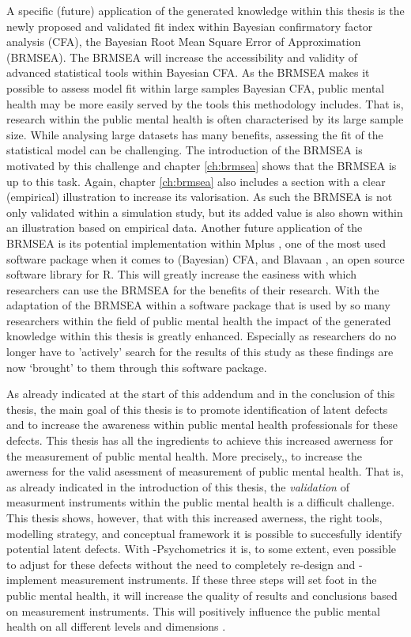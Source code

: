 A specific (future) application of the generated knowledge within this thesis is the newly proposed and validated fit index within Bayesian confirmatory factor analysis (CFA), the Bayesian Root Mean Square Error of Approximation (BRMSEA). 
The BRMSEA will increase the accessibility and validity of advanced statistical tools within Bayesian CFA. 
As the BRMSEA makes it possible to assess model fit within large samples Bayesian CFA, public mental health may be more easily served by the tools this methodology includes. 
That is, research within the public mental health is often characterised by its large sample size. 
While analysing large datasets has many benefits, assessing the fit of the statistical model can be challenging. 
The introduction of the BRMSEA is motivated by this challenge and chapter \ref{ch:brmsea} shows that the BRMSEA is up to this task. 
Again, chapter \ref{ch:brmsea} also includes a section with a clear (empirical) illustration to increase its valorisation. As such the BRMSEA is not only validated within a simulation study, but its added value is also shown within an illustration based on empirical data. 
Another future application of the BRMSEA is its potential implementation within Mplus \parencite{Muthen_1998}, one of the most used software package when it comes to (Bayesian) CFA, and Blavaan \parencite{Merkle_2016}, an open source software library for R. 
This will greatly increase the easiness with which researchers can use the BRMSEA for the benefits of their research. 
With the adaptation of the BRMSEA within a software package that is used by so many researchers within the field of public mental health the impact of the generated knowledge within this thesis is greatly enhanced. 
Especially as researchers do no longer have to 'actively' search for the results of this study as these findings are now `brought' to them through this software package.

As already indicated at the start of this addendum and in the conclusion of this thesis, the main goal of this thesis is to promote identification of latent defects and to increase the awareness within public mental health professionals for these defects.
This thesis has all the ingredients to achieve this increased awerness for the measurement of public mental health.
More precisely,, to increase the awerness for the valid asessment of measurement of public mental health.
That is, as already indicated in the introduction of this thesis, the \textit{validation} of measurment instruments within the public mental health is a difficult challenge.
This thesis shows, however, that with this increased awerness, the right tools, modelling strategy, and conceptual framework it is possible to succesfully identify potential latent defects.
With \textbeta-Psychometrics it is, to some extent, even possible to adjust for these defects without the need to completely re-design and -implement measurement instruments.
If these three steps will set foot in the public mental health, it will increase the quality of results and conclusions based on measurement instruments.
This will positively influence the public mental health on all different levels and dimensions \parencite{WHO_2001}.

